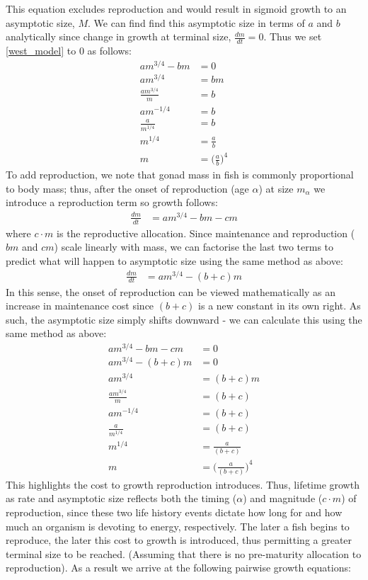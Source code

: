 \documentclass[a4paper]{article} %
\begin{document}
This equation excludes reproduction and would result in sigmoid growth to an asymptotic size, $M$. We can find find this asymptotic size in terms of $a$ and $b$ analytically since change in growth at terminal size, $\frac{dm}{dt} = 0$. Thus we set \eqref{west_model} to 0 as follows:
\begin{align*}
    am^{3/4} - bm &= 0 \\
    am^{3/4} &= bm \\
    \frac{am^{3/4}}{m} &= b \\
    am^{-1/4} &= b \\
    \frac{a}{m^{1/4}} &= b \\
    m^{1/4} &= \frac{a}{b} \\
    m &= \Big(\frac{a}{b}\Big)^4
\end{align*}
To add reproduction, we note that gonad mass in fish is commonly proportional to body mass; thus, after the onset of reproduction (age $\alpha$) at size $m_{\alpha}$ we introduce a reproduction term so growth follows:
\begin{align*}
    \frac{dm}{dt} &= am^{3/4} - bm - cm
\end{align*}
where $c \cdot m$ is the reproductive allocation. Since maintenance and reproduction ($bm$ and $cm$) scale linearly with mass, we can factorise the last two terms to predict what will happen to asymptotic size using the same method as above:
\begin{align*}
    \frac{dm}{dt} &= am^{3/4} - (b+c)m
\end{align*}
In this sense, the onset of reproduction can be viewed mathematically as an increase in maintenance cost since $(b+c)$ is a new constant in its own right. As such, the asymptotic size simply shifts downward - we can calculate this using the same method as above:
\begin{align*}
    am^{3/4} - bm - cm &= 0 \\
    am^{3/4} - (b+c)m &= 0 \\
    am^{3/4} &= (b+c)m \\
    \frac{am^{3/4}}{m} &= (b+c) \\
    am^{-1/4} &= (b+c) \\
    \frac{a}{m^{1/4}} &= (b+c) \\
    m^{1/4} &= \frac{a}{(b+c)} \\
    m &= \Bigg(\frac{a}{(b+c)}\Bigg)^4
\end{align*}
This highlights the cost to growth reproduction introduces. Thus, lifetime growth as rate and asymptotic size reflects both the timing ($\alpha$) and magnitude ($c\cdot{m}$) of reproduction, since these two life history events dictate how long for and how much an organism is devoting to energy, respectively. The later a fish begins to reproduce, the later this cost to growth is introduced, thus permitting a greater terminal size to be reached. (Assuming that there is no pre-maturity allocation to reproduction). As a result we arrive at the following pairwise growth equations:
\end{document}

